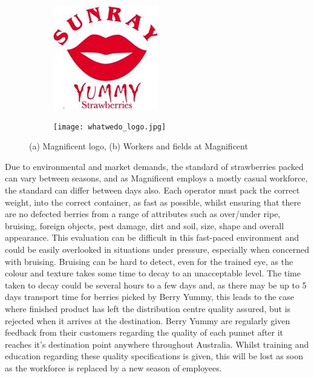 \documentclass[fleqn,twoside,12pt]{report}
\begin{document}
\begin{figure}[h]
	\centering
	\begin{subfigure}{.4\textwidth}
		\centering
		\includegraphics[width=.6\linewidth]{sunray.jpg}
		\caption{}
		\label{fig:sunray}
	\end{subfigure}%
	\begin{subfigure}{.6\textwidth}
		\centering
		\texttt{[image: whatwedo\_logo.jpg]}
		\caption{}
		\label{fig:whatwedo}
	\end{subfigure}%
	\caption{(a) Magnificent logo, (b) Workers and fields at Magnificent}
	\label{fig:test}
\end{figure}



Due to environmental and market demands, the standard of strawberries packed can vary between seasons, and as Magnificent employs a mostly casual workforce, the standard can differ between days also. Each operator must pack the correct weight, into the correct container, as fast as possible, whilst ensuring that there are no defected berries from a range of attributes such as over/under ripe, bruising, foreign objects, pest damage, dirt and soil, size, shape and overall appearance. This evaluation can be difficult in this fast-paced environment and could be easily overlooked in situations under pressure, especially when concerned with bruising. Bruising can be hard to detect, even for the trained eye, as the colour and texture takes some time to decay to an unacceptable level. The time taken to decay could be several hours to a few days and, as there may be up to 5 days transport time for berries picked by Berry Yummy, this leads to the case where finished product has left the distribution centre quality assured, but is rejected when it arrives at the destination. Berry Yummy are regularly given feedback from their customers regarding the quality of each punnet after it reaches it's destination point anywhere throughout Australia. Whilst training and education regarding these quality specifications is given, this will be lost as soon as the workforce is replaced by a new season of employees.  
\end{document}
